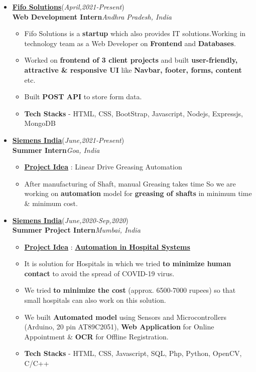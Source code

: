 \documentclass[10pt]{extarticle}
\begin{document}
\begin{itemize}
\item \href{https://www.linkedin.com/company/fifo-solutions/}{\textbf{Fifo Solutions}}\hfill\hfill(\textit{April,2021-Present})\\
\textbf{Web Development Intern}\hfill\hfill\textit{Andhra Pradesh, India}
    \begin{itemize}
        \item Fifo Solutions is a \textbf{startup} which also provides IT solutions.Working in technology team as a Web Developer on \textbf{Frontend} and \textbf{Databases}.
        \item Worked on \textbf{frontend of 3 client projects} and built \textbf{user-friendly, attractive \& responsive UI} like \textbf{Navbar, footer, forms, content} etc.
        \item Built \textbf{POST API} to store form data.
        \item \textbf{Tech Stacks} - HTML, CSS, BootStrap, Javascript, Nodejs, Expressjs, MongoDB
    \end{itemize}
\item \href{https://www.linkedin.com/company/siemens/mycompany/verification/}{\textbf{Siemens India}}\hfill\hfill(\textit{June,2021-Present})\\
\textbf{Summer Intern}\hfill\hfill\textit{Goa, India}
     \begin{itemize}
         \item \underline{\textbf{Project Idea}} : Linear Drive Greasing Automation
         \item After manufacturing of Shaft, manual Greasing takes time So we are working on \textbf{automation} model for \textbf{greasing of shafts} in minimum time \& minimum cost.
     \end{itemize}
\item \href{https://www.linkedin.com/company/siemens/mycompany/verification/}{\textbf{Siemens India}}\hfill\hfill(\textit{June,2020-Sep,2020})\\
\textbf{Summer Project Intern}\hfill\hfill\textit{Mumbai, India}
      \begin{itemize}
          \item \underline{\textbf{Project Idea}} : \href{https://github.com/PSoni8/Seimens-Project}{\textbf{Automation in Hospital Systems}}
          \item It is solution for Hospitals in which we tried \textbf{to minimize human contact} to avoid the spread of COVID-19 virus.
          \item We tried \textbf{to minimize the cost} (approx. 6500-7000 rupees) so that small hospitals can also work on this solution.
          \item We built \textbf{Automated model} using Sensors and Microcontrollers (Arduino, 20 pin AT89C2051), \textbf{Web Application} for Online Appointment \& \textbf{OCR} for Offline Registration.
          \item \textbf{Tech Stacks} -  HTML, CSS, Javascript, SQL, Php, Python, OpenCV, C/C++
      \end{itemize}
\end{itemize}
\end{document}
